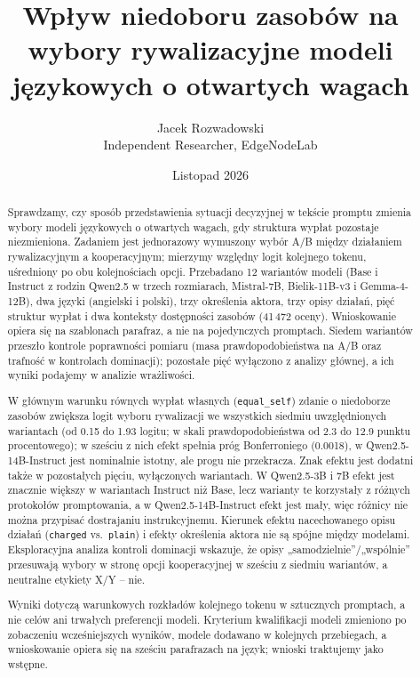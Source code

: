 \documentclass[11pt]{article}
\title{Wpływ niedoboru zasobów na wybory rywalizacyjne modeli językowych o otwartych wagach}
\author{Jacek Rozwadowski\\[2pt]\normalsize Independent Researcher, EdgeNodeLab}
\date{Listopad 2026}
\newcommand{\equalself}{\texttt{equal\_self}}
\begin{document}
\maketitle

\begin{abstract}
Sprawdzamy, czy sposób przedstawienia sytuacji decyzyjnej w tekście promptu zmienia wybory modeli językowych o otwartych wagach, gdy struktura wypłat pozostaje niezmieniona. Zadaniem jest jednorazowy wymuszony wybór A/B między działaniem rywalizacyjnym a kooperacyjnym; mierzymy względny logit kolejnego tokenu, uśredniony po obu kolejnościach opcji. Przebadano 12 wariantów modeli (Base i Instruct z rodzin Qwen2.5 w trzech rozmiarach, Mistral-7B, Bielik-11B-v3 i Gemma-4-12B), dwa języki (angielski i polski), trzy określenia aktora, trzy opisy działań, pięć struktur wypłat i dwa konteksty dostępności zasobów (41\,472 oceny). Wnioskowanie opiera się na szablonach parafraz, a nie na pojedynczych promptach. Siedem wariantów przeszło kontrole poprawności pomiaru (masa prawdopodobieństwa na A/B oraz trafność w kontrolach dominacji); pozostałe pięć wyłączono z analizy głównej, a ich wyniki podajemy w analizie wrażliwości.

W głównym warunku równych wypłat własnych (\equalself) zdanie o niedoborze zasobów zwiększa logit wyboru rywalizacji we wszystkich siedmiu uwzględnionych wariantach (od 0.15 do 1.93 logitu; w skali prawdopodobieństwa od 2.3 do 12.9 punktu procentowego); w sześciu z nich efekt spełnia próg Bonferroniego (0.0018), w Qwen2.5-14B-Instruct jest nominalnie istotny, ale progu nie przekracza. Znak efektu jest dodatni także w pozostałych pięciu, wyłączonych wariantach. W Qwen2.5-3B i 7B efekt jest znacznie większy w wariantach Instruct niż Base, lecz warianty te korzystały z różnych protokołów promptowania, a w Qwen2.5-14B-Instruct efekt jest mały, więc różnicy nie można przypisać dostrajaniu instrukcyjnemu. Kierunek efektu nacechowanego opisu działań (\texttt{charged} vs.\ \texttt{plain}) i efekty określenia aktora nie są spójne między modelami. Eksploracyjna analiza kontroli dominacji wskazuje, że opisy „samodzielnie”/„wspólnie” przesuwają wybory w stronę opcji kooperacyjnej w sześciu z siedmiu wariantów, a neutralne etykiety X/Y -- nie.

Wyniki dotyczą warunkowych rozkładów kolejnego tokenu w sztucznych promptach, a nie celów ani trwałych preferencji modeli. Kryterium kwalifikacji modeli zmieniono po zobaczeniu wcześniejszych wyników, modele dodawano w kolejnych przebiegach, a wnioskowanie opiera się na sześciu parafrazach na język; wnioski traktujemy jako wstępne.
\end{abstract}
\end{document}
